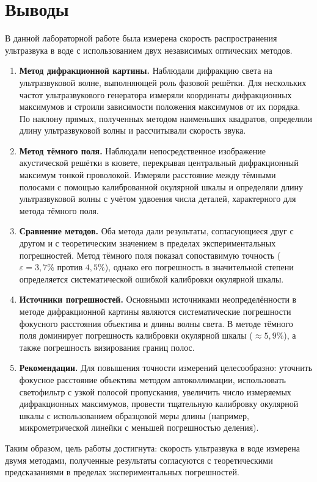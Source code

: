 \documentclass[a4paper]{article}
\begin{document}
\section{Выводы}

В данной лабораторной работе была измерена скорость распространения ультразвука в воде с использованием двух независимых оптических методов.

\begin{enumerate}
    \item \textbf{Метод дифракционной картины.} Наблюдали дифракцию света на ультразвуковой волне, выполняющей роль фазовой решётки. Для нескольких частот ультразвукового генератора измеряли координаты дифракционных максимумов и строили зависимости положения максимумов от их порядка. По наклону прямых, полученных методом наименьших квадратов, определяли длину ультразвуковой волны и рассчитывали скорость звука.
    
    \item \textbf{Метод тёмного поля.} Наблюдали непосредственное изображение акустической решётки в кювете, перекрывая центральный дифракционный максимум тонкой проволокой. Измеряли расстояние между тёмными полосами с помощью калиброванной окулярной шкалы и определяли длину ультразвуковой волны с учётом удвоения числа деталей, характерного для метода тёмного поля.
    
    \item \textbf{Сравнение методов.} Оба метода дали результаты, согласующиеся друг с другом и с теоретическим значением в пределах экспериментальных погрешностей. Метод тёмного поля показал сопоставимую точность ($\varepsilon = 3{,}7\%$ против $4{,}5\%$), однако его погрешность в значительной степени определяется систематической ошибкой калибровки окулярной шкалы.
    
    \item \textbf{Источники погрешностей.} Основными источниками неопределённости в методе дифракционной картины являются систематические погрешности фокусного расстояния объектива и длины волны света. В методе тёмного поля доминирует погрешность калибровки окулярной шкалы ($\approx 5{,}9\%$), а также погрешность визирования границ полос.
    
    \item \textbf{Рекомендации.} Для повышения точности измерений целесообразно: уточнить фокусное расстояние объектива методом автоколлимации, использовать светофильтр с узкой полосой пропускания, увеличить число измеряемых дифракционных максимумов, провести тщательную калибровку окулярной шкалы с использованием образцовой меры длины (например, микрометрической линейки с меньшей погрешностью деления).
\end{enumerate}

Таким образом, цель работы достигнута: скорость ультразвука в воде измерена двумя методами, полученные результаты согласуются с теоретическими предсказаниями в пределах экспериментальных погрешностей.
\end{document}
